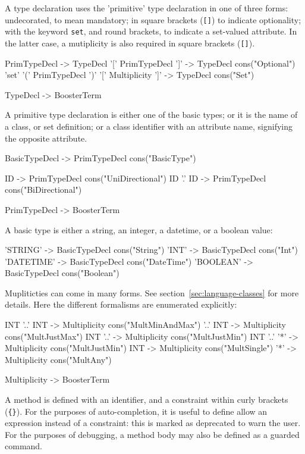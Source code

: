 A type declaration uses the 'primitive' type declaration in one of
three forms: undecorated, to mean mandatory; in square brackets
(\verb|[]|) to indicate optionality; with the keyword \verb|set|, and
round brackets, to indicate a set-valued attribute.  In the latter
case, a mutiplicity is also required in square brackets (\verb|[]|).

\begin{code}
PrimTypeDecl               -> TypeDecl  
'[' PrimTypeDecl ']'       -> TypeDecl {cons("Optional")} 
'set' '(' PrimTypeDecl ')' '[' Multiplicity ']' 
                           ->  TypeDecl {cons("Set")}

TypeDecl -> BoosterTerm
\end{code}

A primitive type declaration is either one of the basic types; or it
is the name of a class, or set definition; or a class identifier with
an attribute name, signifying the opposite attribute.

\begin{code}
BasicTypeDecl -> PrimTypeDecl {cons("BasicType")}

ID            -> PrimTypeDecl {cons("UniDirectional")}
ID '.' ID     -> PrimTypeDecl {cons("BiDirectional")}

PrimTypeDecl -> BoosterTerm
\end{code}

A basic type is either a string, an integer, a datetime, or a boolean
value:
\begin{code}
'STRING'   -> BasicTypeDecl {cons("String")}
'INT'      -> BasicTypeDecl {cons("Int")}
'DATETIME' -> BasicTypeDecl {cons("DateTime")}
'BOOLEAN'  -> BasicTypeDecl {cons("Boolean")}
\end{code}	 

Mupliticties can come in many forms.  See
section~\ref{sec:language-classes} for more details.  Here the
different formalisms are enumerated explicitly:

\begin{code}
INT '..' INT -> Multiplicity {cons("MultMinAndMax")}
    '..' INT -> Multiplicity {cons("MultJustMax")}
INT '..'     -> Multiplicity {cons("MultJustMin")}
INT '..' '*' -> Multiplicity {cons("MultJustMin")}
    INT      -> Multiplicity {cons("MultSingle")}
    '*'      -> Multiplicity {cons("MultAny")}

Multiplicity -> BoosterTerm
\end{code}


A method is defined with an identifier, and a constraint within curly
brackets (\verb|{}|).  For the purposes of auto-completion, it is
useful to define allow an expression instead of a constraint: this is
marked as deprecated to warn the user.  For the purposes of debugging,
a method body may also be defined as a guarded command.

